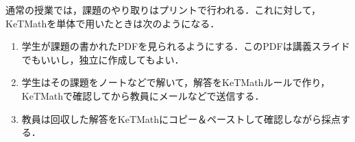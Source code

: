 \documentclass[a4j,12pt]{ujarticle}
\begin{document}
通常の授業では，課題のやり取りはプリントで行われる．これに対して，
KeTMathを単体で用いたときは次のようになる．\vspace{-1mm}
\begin{enumerate}
\item 学生が課題の書かれたPDFを見られるようにする．このPDFは講義スライドでもいいし，独立に作成してもよい．\vspace{-2mm}
\item 学生はその課題をノートなどで解いて，解答をKeTMathルールで作り，
KeTMathで確認してから教員にメールなどで送信する．\vspace{-2mm}
\item 教員は回収した解答をKeTMathにコピー＆ペーストして確認しながら採点する．\vspace{-4mm}
\end{enumerate}
\end{document}
